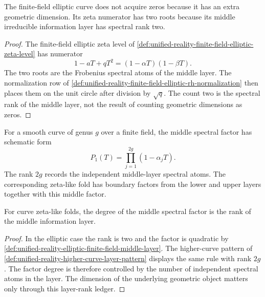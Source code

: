 \begin{theorem}
\label{thm:unified-reality-elliptic-two-middle-spectral-atoms}
The finite-field elliptic curve does not acquire zeros because it has an
extra geometric dimension.  Its zeta numerator has two roots because its
middle irreducible information layer has spectral rank two.
\end{theorem}

\begin{proof}
The finite-field elliptic zeta level of
\autoref{def:unified-reality-finite-field-elliptic-zeta-level} has
numerator
$$
1-aT+qT^2=(1-\alpha T)(1-\beta T).
$$
The two roots are the Frobenius spectral atoms of the middle layer.  The
normalization row of
\autoref{def:unified-reality-finite-field-elliptic-rh-normalization}
then places them on the unit circle after division by $\sqrt q$.  The
count two is the spectral rank of the middle layer, not the result of
counting geometric dimensions as zeros.
\end{proof}

\begin{definition}
\label{def:unified-reality-higher-curve-layer-pattern}
For a smooth curve of genus $g$ over a finite field, the middle spectral
factor has schematic form
$$
P_1(T)=\prod_{j=1}^{2g}(1-\alpha_jT).
$$
The rank $2g$ records the independent middle-layer spectral atoms.  The
corresponding zeta-like fold has boundary factors from the lower and
upper layers together with this middle factor.
\end{definition}

\begin{theorem}
\label{thm:unified-reality-layer-rank-determines-factor-degree}
For curve zeta-like folds, the degree of the middle spectral factor is
the rank of the middle information layer.
\end{theorem}

\begin{proof}
In the elliptic case the rank is two and the factor is quadratic by
\autoref{def:unified-reality-elliptic-finite-field-middle-layer}.  The
higher-curve pattern of
\autoref{def:unified-reality-higher-curve-layer-pattern} displays the
same rule with rank $2g$.  The factor degree is therefore controlled by
the number of independent spectral atoms in the layer.  The dimension of
the underlying geometric object matters only through this layer-rank
ledger.
\end{proof}

